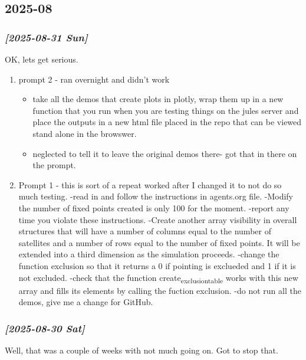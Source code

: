 \documentclass[11pt]{article}
\begin{document}
\subsection{2025-08}
\label{sec:org274071a}


\subsubsection{\textit{[2025-08-31 Sun]}}
\label{sec:org03b36f1}
OK, lets get serious.


\begin{enumerate}
\item prompt 2 - ran overnight and didn't work
\label{sec:orgac9c02f}
\begin{itemize}
\item take all the demos that create plots in plotly, wrap them up in a new
function that you run when you are testing things on the jules server
and place the outputs in a new html file placed in the repo that
can be viewed stand alone in the browswer.
\item neglected to tell it to leave the original demos there- got that in there
on the prompt.
\end{itemize}

\item Prompt 1 - this is sort of a repeat  worked after I changed it to not do so much testing.
\label{sec:org6f01d48}
-read in and follow the instructions in agents.org file.
-Modify the number of fixed points created is only 100 for the moment.
-report any time you violate these instructions.
-Create another array visibility in overall structures that will have a number of columns equal to the number of satellites and a number of rows equal to the number of fixed points. It will be extended into a third dimension as the simulation proceeds.
-change the function exclusion so that it returns a 0 if pointing is exclueded and 1 if it is not excluded.
-check that the function create\textsubscript{exclusion}\textsubscript{table} works with this new array and fills its elements by calling the fuction exclusion.
-do not run all the demos, give me a change for GitHub.
\end{enumerate}


\subsubsection{\textit{[2025-08-30 Sat]}}
\label{sec:org3057c15}
Well, that was a couple of weeks with not much going on.  Got to stop that.
\end{document}
